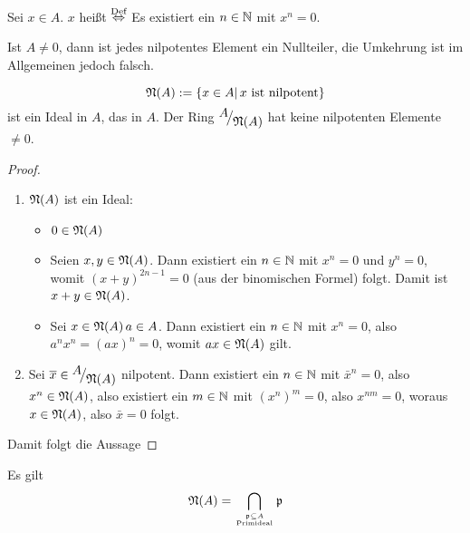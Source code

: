 \begin{df}\label{11.3}
	Sei $x\in A$. $x$ heißt  $\overset{\text{Def}}{\Leftrightarrow}$ Es existiert ein $n\in \mathbb{N}$ mit $x^n=0$.
\end{df}
\begin{anm}
	Ist $A\neq 0$, dann ist jedes nilpotentes Element ein Nullteiler, die Umkehrung ist im Allgemeinen jedoch falsch.
\end{anm}
\begin{bem+df}
	$$\mathfrak{N}(A) := \{x\in A|\, x\text{ ist nilpotent}\}$$
	ist ein Ideal in $A$, das  in $A$. Der Ring $\QR{A}{\NN(A)}$ hat keine nilpotenten Elemente $\neq 0$.
\end{bem+df}
\begin{proof}
	\begin{enumerate}
		\item $\mathfrak{N}(A)$ ist ein Ideal:
		\begin{itemize}
			\item $0\in \mathfrak{N}(A)$
			\item Seien $x,y\in \mathfrak{N}(A)$. Dann existiert ein $n\in \mathbb{N}$ mit $x^n=0$ und $y^n=0$, womit $(x+y)^{2n-1} =0$ (aus der binomischen Formel) folgt. Damit ist $x+y \in \mathfrak{N}(A)$.
			\item Sei $x\in \mathfrak{N}(A)\, a\in A$. Dann existiert ein $n\in \mathbb{N}$ mit $x^n=0$, also $a^nx^n = (ax)^n=0$, womit $ax \in \mathfrak{N}(A)$ gilt.
		\end{itemize}
	\item Sei $\bar x \in \QR{A}{\NN(A)}$ nilpotent. Dann existiert ein $n\in \mathbb{N}$ mit $\bar x^n=0$, also $x^n \in \mathfrak{N}(A)$, also existiert ein $m\in \mathbb{N}$ mit $(x^n)^m=0$, also $x^{nm} = 0$, woraus $x\in \mathfrak{N}(A)$, also $\bar x=0$ folgt.
	\end{enumerate}
Damit folgt die Aussage
\end{proof}
\begin{sa}\label{11.5}
	Es gilt
	$$\mathfrak{N}(A) = \bigcap_{\mathfrak{p} \subseteq A\atop \text{Primideal}} \mathfrak{p}$$
\end{sa}

